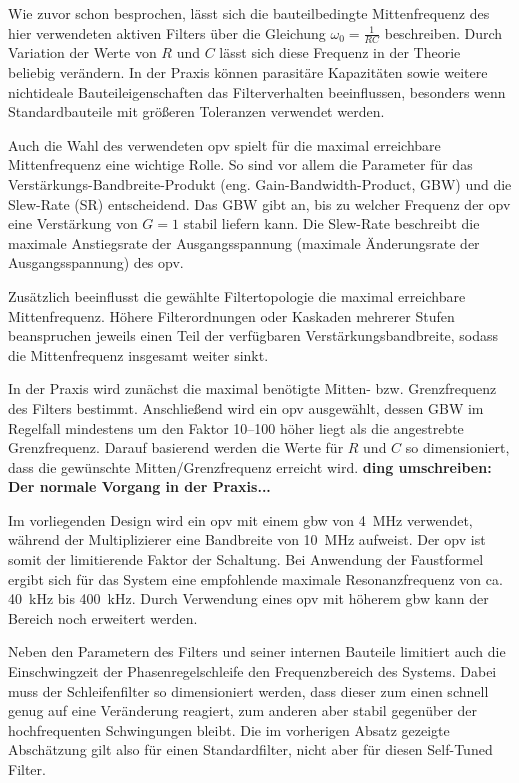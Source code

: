 \documentclass[../main.tex]{subfiles}
\begin{document}
Wie zuvor schon besprochen, lässt sich die bauteilbedingte Mittenfrequenz des hier verwendeten aktiven Filters über die Gleichung $\omega_0 = \frac{1}{RC}$ beschreiben. Durch Variation der Werte von $R$ und $C$ lässt sich diese Frequenz in der Theorie beliebig verändern. In der Praxis können parasitäre Kapazitäten sowie weitere nichtideale Bauteileigenschaften das Filterverhalten beeinflussen, besonders wenn Standardbauteile mit größeren Toleranzen verwendet werden.\par
\medskip
Auch die Wahl des verwendeten \gls{opv} spielt für die maximal erreichbare Mittenfrequenz eine wichtige Rolle. So sind vor allem die Parameter für das Verstärkungs-Bandbreite-Produkt (eng. Gain-Bandwidth-Product, GBW) und die Slew-Rate (SR) entscheidend. Das GBW gibt an, bis zu welcher Frequenz der \gls{opv} eine Verstärkung von $G=1$ stabil liefern kann. Die Slew-Rate beschreibt die maximale Anstiegsrate der Ausgangsspannung (maximale Änderungsrate der Ausgangsspannung) des \gls{opv}.\cite{halbleiter_4Quad}\par
\medskip
Zusätzlich beeinflusst die gewählte Filtertopologie die maximal erreichbare  Mittenfrequenz. Höhere Filterordnungen oder Kaskaden mehrerer Stufen beanspruchen jeweils einen Teil der verfügbaren Verstärkungsbandbreite, sodass die Mittenfrequenz insgesamt weiter sinkt.\par
\medskip
In der Praxis wird zunächst die maximal benötigte Mitten- bzw. Grenzfrequenz des Filters bestimmt. Anschließend wird ein \gls{opv} ausgewählt, dessen GBW im Regelfall mindestens um den Faktor \numrange{10}{100} höher liegt als die angestrebte Grenzfrequenz. Darauf basierend werden die Werte für $R$ und $C$ so dimensioniert, dass die gewünschte Mitten/Grenzfrequenz erreicht wird.\cite{microchipADN003, YT_opv_active_filters} \textbf{ding umschreiben: Der normale Vorgang in der Praxis...}\par
\medskip

Im vorliegenden Design wird ein \gls{opv} mit einem \gls{gbw} von \SI{4}{\mega\hertz} verwendet, während der Multiplizierer eine Bandbreite von \SI{10}{\mega\hertz} aufweist. Der \gls{opv} ist somit der limitierende Faktor der Schaltung. Bei Anwendung der Faustformel ergibt sich für das System eine empfohlende maximale Resonanzfrequenz von ca. \SI{40}{\kilo\hertz} bis \SI{400}{\kilo\hertz}. Durch Verwendung eines \gls{opv} mit höherem \gls{gbw} kann der Bereich noch erweitert werden. \par
\medskip

Neben den Parametern des Filters und seiner internen Bauteile limitiert auch die Einschwingzeit der Phasenregelschleife den Frequenzbereich des Systems. Dabei muss der Schleifenfilter so dimensioniert werden, dass dieser zum einen schnell genug auf eine Veränderung reagiert, zum anderen aber stabil gegenüber der hochfrequenten Schwingungen bleibt. Die im vorherigen Absatz gezeigte Abschätzung gilt also für einen Standardfilter, nicht aber für diesen Self-Tuned Filter.\par
\medskip
\end{document}
